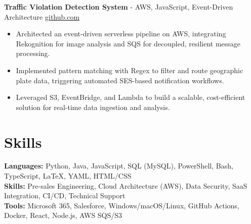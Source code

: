 \documentclass[11pt]{article}       %
\begin{document}
\textbf{Traffic Violation Detection System}{ - AWS, JavaScript, Event-Driven Architecture} \hfill \href{https://github.com/Monica20030707/AWS_rekonigition-N-read-database}{github.com} \\
\vspace{-9pt}
\begin{itemize}
  \item Architected an event-driven serverless pipeline on AWS, integrating Rekognition for image analysis and SQS for decoupled, resilient message processing.
  \item Implemented pattern matching with Regex to filter and route geographic plate data, triggering automated SES-based notification workflows.
  \item Leveraged S3, EventBridge, and Lambda to build a scalable, cost-efficient solution for real-time data ingestion and analysis.
\end{itemize}

\vspace{-18.5pt}


\section*{Skills}
\textbf{Languages:} Python, Java, JavaScript, SQL (MySQL), PowerShell, Bash, TypeScript, LaTeX, YAML, HTML/CSS\\
\textbf{Skills:} Pre-sales Engineering, Cloud Architecture (AWS), Data Security, SaaS Integration, CI/CD, Technical Support\\
\textbf{Tools:} Microsoft 365, Salesforce, Windows/macOS/Linux, GitHub Actions, Docker, React, Node.js, AWS SQS/S3\\

\vspace{-6.5pt}
\end{document}
